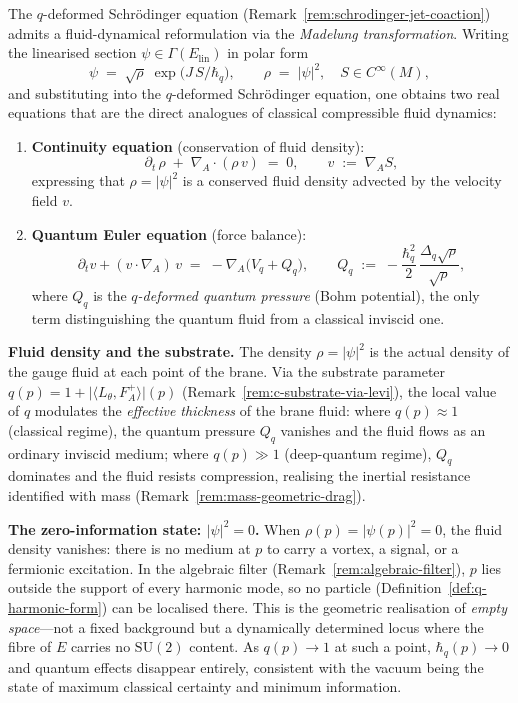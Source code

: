 \begin{remark}
\label{rem:madelung-fluid}
The $q$-deformed Schr\"odinger equation
(Remark~\ref{rem:schrodinger-jet-coaction}) admits a fluid-dynamical
reformulation via the \emph{Madelung transformation}.  Writing the
linearised section $\psi \in \Gamma(E_{\mathrm{lin}})$ in polar form
\[
  \psi \;=\; \sqrt{\rho}\;\exp\!\bigl(J\,S/\hbar_q\bigr),
  \qquad
  \rho \;=\; \lvert\psi\rvert^2, \quad S \in C^\infty(M),
\]
and substituting into the $q$-deformed Schr\"odinger equation, one
obtains two real equations that are the direct analogues of classical
compressible fluid dynamics:
\begin{enumerate}
  \item \textbf{Continuity equation} (conservation of fluid density):
    \[
      \partial_t\,\rho \;+\; \nabla_{\!A} \cdot (\rho\,v) \;=\; 0,
      \qquad
      v \;:=\; \nabla_{\!A} S,
    \]
    expressing that $\rho = \lvert\psi\rvert^2$ is a conserved fluid
    density advected by the velocity field $v$.
  \item \textbf{Quantum Euler equation} (force balance):
    \[
      \partial_t v + (v \cdot \nabla_{\!A})\,v
      \;=\; -\nabla_{\!A}\!\bigl(V_q + Q_q\bigr),
      \qquad
      Q_q \;:=\; -\frac{\hbar_q^2}{2}\,
                  \frac{\Delta_q\sqrt{\rho}}{\sqrt{\rho}},
    \]
    where $Q_q$ is the \emph{$q$-deformed quantum pressure} (Bohm
    potential), the only term distinguishing the quantum fluid from a
    classical inviscid one.
\end{enumerate}

\medskip
\noindent\textbf{Fluid density and the substrate.}\;
The density $\rho = \lvert\psi\rvert^2$ is the actual density of the
gauge fluid at each point of the brane.  Via the substrate parameter
$q(p) = 1 + \lvert\langle L_\theta, F_A^+\rangle\rvert(p)$
(Remark~\ref{rem:c-substrate-via-levi}), the local value of $q$
modulates the \emph{effective thickness} of the brane fluid: where
$q(p) \approx 1$ (classical regime), the quantum pressure $Q_q$
vanishes and the fluid flows as an ordinary inviscid medium; where
$q(p) \gg 1$ (deep-quantum regime), $Q_q$ dominates and the fluid
resists compression, realising the inertial resistance identified with
mass (Remark~\ref{rem:mass-geometric-drag}).

\medskip
\noindent\textbf{The zero-information state: $\lvert\psi\rvert^2 = 0$.}\;
When $\rho(p) = \lvert\psi(p)\rvert^2 = 0$, the fluid density vanishes:
there is no medium at $p$ to carry a vortex, a signal, or a fermionic
excitation.  In the algebraic filter
(Remark~\ref{rem:algebraic-filter}), $p$ lies outside the support of
every harmonic mode, so no particle
(Definition~\ref{def:q-harmonic-form}) can be localised there.  This is
the geometric realisation of \emph{empty space}---not a fixed background
but a dynamically determined locus where the fibre of $E$ carries no
$\mathrm{SU}(2)$ content.  As $q(p) \to 1$ at such a point,
$\hbar_q(p) \to 0$ and quantum effects disappear entirely, consistent
with the vacuum being the state of maximum classical certainty and minimum
information.


\end{remark}
